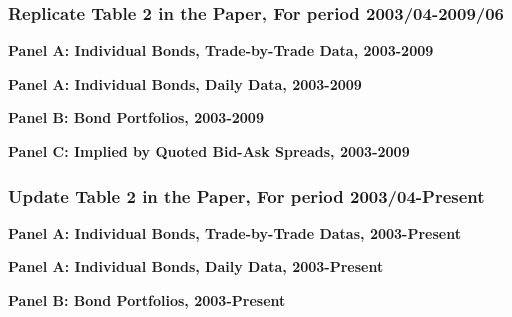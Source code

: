 \documentclass{article}
\newcommand*{\PathToOutput}{../output/}%
\begin{document}
\subsubsection{Replicate Table 2 in the Paper, For period 2003/04-2009/06}
\doublespacing
\begin{table}[hbt!]
\centering
\textbf{\large Panel A: Individual Bonds, Trade-by-Trade Data, 2003-2009}

\label{table:table2_panelA_trade_by_trade_paper}
\end{table}

\begin{table}[hbt!]
\centering
\textbf{\large Panel A: Individual Bonds, Daily Data, 2003-2009}

\label{table:table2_panelA_daily_paper}
\end{table}

\begin{table}[hbt!]
\centering
\textbf{\large Panel B: Bond Portfolios, 2003-2009}

\label{table:table2_panelB_paper}
\end{table}

\begin{table}[hbt!]
\centering
\textbf{\large Panel C: Implied by Quoted Bid-Ask Spreads, 2003-2009}

\label{table:table2_panelC_paper}
\end{table}


\subsubsection{Update Table 2 in the Paper, For period 2003/04-Present}

\begin{table}[hbt!]
\centering
\textbf{\large Panel A: Individual Bonds, Trade-by-Trade Datas, 2003-Present}
\resizebox{\textwidth}{!}{%
    
}
\label{table:table2_panelA_trade_by_trade_new}
\end{table}

\begin{table}[hbt!]
\centering
\textbf{\large Panel A: Individual Bonds, Daily Data, 2003-Present}
\resizebox{\textwidth}{!}{%
    
}
\label{table:table2_panelA_daily_new}
\end{table}


\begin{table}[hbt!]
\centering
\textbf{\large Panel B: Bond Portfolios, 2003-Present}
\resizebox{\textwidth}{!}{%
    
}
\label{table:table2_panelB_new}
\end{table}
\end{document}
